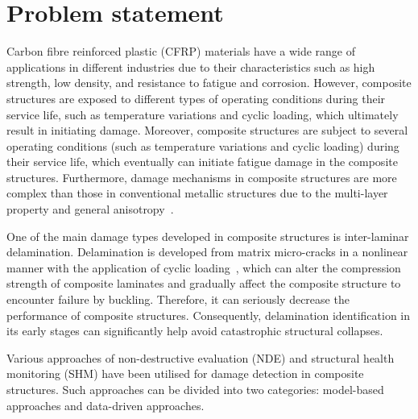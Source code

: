 \section{Problem statement}
\label{sec11}
Carbon fibre reinforced plastic (CFRP) materials have a wide range of applications in different industries due to their characteristics such as high strength, low density, and resistance to fatigue and corrosion.
However, composite structures are exposed to different types of operating conditions during their service life, such as temperature variations and cyclic loading, which ultimately result in initiating damage.
Moreover, composite structures are subject to several operating conditions (such as temperature variations and cyclic loading) during their service life, which eventually can initiate fatigue damage in the composite structures.
Furthermore, damage mechanisms in composite structures are more complex than those in conventional metallic structures due to the multi-layer property and general anisotropy~\cite{Wu2021}. 

One of the main damage types developed in composite structures is inter-laminar delamination.
Delamination is developed from matrix micro-cracks in a nonlinear manner with the application of cyclic loading~\cite{Reifsnider1983, Wu2021}, which can alter the compression strength of composite laminates and gradually affect the composite structure to encounter failure by buckling. Therefore, it can seriously decrease the performance of composite structures.
Consequently, delamination identification in its early stages can significantly help avoid catastrophic structural collapses.

Various approaches of non-destructive evaluation (NDE) and structural health monitoring (SHM) have been utilised for damage detection in composite structures.
Such approaches can be divided into two categories: model-based approaches and data-driven approaches.

